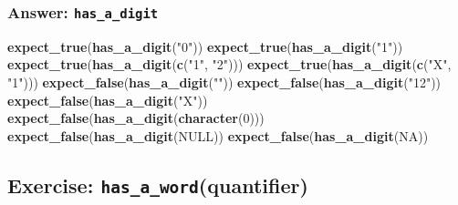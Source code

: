 \documentclass[]{book}
\newenvironment{Shaded}{}{}
\newcommand{\ControlFlowTok}[1]{\textcolor[rgb]{0.00,0.44,0.13}{\textbf{#1}}}
\newcommand{\DecValTok}[1]{\textcolor[rgb]{0.25,0.63,0.44}{#1}}
\newcommand{\KeywordTok}[1]{\textcolor[rgb]{0.00,0.44,0.13}{\textbf{#1}}}
\newcommand{\NormalTok}[1]{#1}
\newcommand{\OperatorTok}[1]{\textcolor[rgb]{0.40,0.40,0.40}{#1}}
\newcommand{\OtherTok}[1]{\textcolor[rgb]{0.00,0.44,0.13}{#1}}
\newcommand{\StringTok}[1]{\textcolor[rgb]{0.25,0.44,0.63}{#1}}
\begin{document}
\hypertarget{answer-has_a_digit}{%
\subsubsection{\texorpdfstring{Answer: \texttt{has\_a\_digit}}{Answer: has\_a\_digit}}\label{answer-has_a_digit}}

\begin{Shaded}
\end{Shaded}

\begin{Shaded}
\begin{Highlighting}[]
\KeywordTok{expect_true}\NormalTok{(}\KeywordTok{has_a_digit}\NormalTok{(}\StringTok{"0"}\NormalTok{))}
\KeywordTok{expect_true}\NormalTok{(}\KeywordTok{has_a_digit}\NormalTok{(}\StringTok{"1"}\NormalTok{))}
\KeywordTok{expect_true}\NormalTok{(}\KeywordTok{has_a_digit}\NormalTok{(}\KeywordTok{c}\NormalTok{(}\StringTok{"1"}\NormalTok{, }\StringTok{"2"}\NormalTok{)))}
\KeywordTok{expect_true}\NormalTok{(}\KeywordTok{has_a_digit}\NormalTok{(}\KeywordTok{c}\NormalTok{(}\StringTok{"X"}\NormalTok{, }\StringTok{"1"}\NormalTok{)))}
\KeywordTok{expect_false}\NormalTok{(}\KeywordTok{has_a_digit}\NormalTok{(}\StringTok{""}\NormalTok{))}
\KeywordTok{expect_false}\NormalTok{(}\KeywordTok{has_a_digit}\NormalTok{(}\StringTok{"12"}\NormalTok{))}
\KeywordTok{expect_false}\NormalTok{(}\KeywordTok{has_a_digit}\NormalTok{(}\StringTok{"X"}\NormalTok{))}
\KeywordTok{expect_false}\NormalTok{(}\KeywordTok{has_a_digit}\NormalTok{(}\KeywordTok{character}\NormalTok{(}\DecValTok{0}\NormalTok{)))}
\KeywordTok{expect_false}\NormalTok{(}\KeywordTok{has_a_digit}\NormalTok{(}\OtherTok{NULL}\NormalTok{))}
\KeywordTok{expect_false}\NormalTok{(}\KeywordTok{has_a_digit}\NormalTok{(}\OtherTok{NA}\NormalTok{))}
\end{Highlighting}
\end{Shaded}

\hypertarget{exercise-has_a_wordquantifier}{%
\subsection{\texorpdfstring{Exercise: \texttt{has\_a\_word}(quantifier)}{Exercise: has\_a\_word(quantifier)}}\label{exercise-has_a_wordquantifier}}
\end{document}
